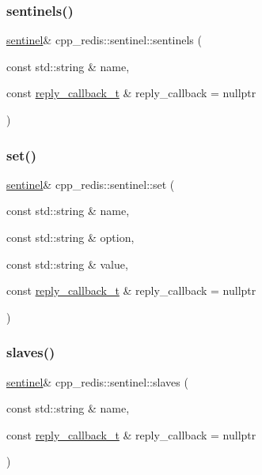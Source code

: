 \subsubsection{\texorpdfstring{sentinels()}{sentinels()}}
{\footnotesize\ttfamily \hyperlink{classcpp__redis_1_1sentinel}{sentinel}\& cpp\+\_\+redis\+::sentinel\+::sentinels (\begin{DoxyParamCaption}\item[{const std\+::string \&}]{name,  }\item[{const \hyperlink{classcpp__redis_1_1sentinel_ae1a150ff8787208c47414397a061c9a7}{reply\+\_\+callback\+\_\+t} \&}]{reply\+\_\+callback = {\ttfamily nullptr} }\end{DoxyParamCaption})}

\mbox{\label{classcpp__redis_1_1sentinel_a1579c9c9b8ac3cded0a7d70e709e5e1b}} 
\subsubsection{\texorpdfstring{set()}{set()}}
{\footnotesize\ttfamily \hyperlink{classcpp__redis_1_1sentinel}{sentinel}\& cpp\+\_\+redis\+::sentinel\+::set (\begin{DoxyParamCaption}\item[{const std\+::string \&}]{name,  }\item[{const std\+::string \&}]{option,  }\item[{const std\+::string \&}]{value,  }\item[{const \hyperlink{classcpp__redis_1_1sentinel_ae1a150ff8787208c47414397a061c9a7}{reply\+\_\+callback\+\_\+t} \&}]{reply\+\_\+callback = {\ttfamily nullptr} }\end{DoxyParamCaption})}

\mbox{\label{classcpp__redis_1_1sentinel_aa4b19659807388d276764f9a79132d00}} 
\subsubsection{\texorpdfstring{slaves()}{slaves()}}
{\footnotesize\ttfamily \hyperlink{classcpp__redis_1_1sentinel}{sentinel}\& cpp\+\_\+redis\+::sentinel\+::slaves (\begin{DoxyParamCaption}\item[{const std\+::string \&}]{name,  }\item[{const \hyperlink{classcpp__redis_1_1sentinel_ae1a150ff8787208c47414397a061c9a7}{reply\+\_\+callback\+\_\+t} \&}]{reply\+\_\+callback = {\ttfamily nullptr} }\end{DoxyParamCaption})}

